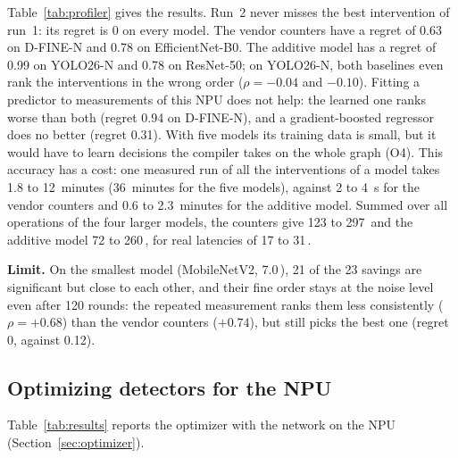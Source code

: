 \documentclass[conference]{IEEEtran}
\newcommand{\ms}{\,\text{ms}}
\begin{document}
Table~\ref{tab:profiler} gives the results. Run~2 never misses the best intervention of run~1: its regret is 0 on every model. The vendor counters have a regret of 0.63 on D-FINE-N and 0.78 on EfficientNet-B0. The additive model has a regret of 0.99 on YOLO26-N and 0.78 on ResNet-50; on YOLO26-N, both baselines even rank the interventions in the wrong order ($\rho = -0.04$ and $-0.10$). Fitting a predictor to measurements of this NPU does not help: the learned one ranks worse than both (regret 0.94 on D-FINE-N), and a gradient-boosted regressor does no better (regret 0.31). With five models its training data is small, but it would have to learn decisions the compiler takes on the whole graph (O4). This accuracy has a cost: one measured run of all the interventions of a model takes 1.8 to 12~minutes (36~minutes for the five models), against 2 to 4~s for the vendor counters and 0.6 to 2.3~minutes for the additive model. Summed over all operations of the four larger models, the counters give 123 to 297\ms{} and the additive model 72 to 260\ms{}, for real latencies of 17 to 31\ms{}.

\textbf{Limit.} On the smallest model (MobileNetV2, 7.0\ms{}), 21 of the 23 savings are significant but close to each other, and their fine order stays at the noise level even after 120 rounds: the repeated measurement ranks them less consistently ($\rho = +0.68$) than the vendor counters ($+0.74$), but still picks the best one (regret 0, against 0.12).

\subsection{Optimizing detectors for the NPU}
\label{sec:eval-optimizer}

Table~\ref{tab:results} reports the optimizer with the network on the NPU (Section~\ref{sec:optimizer}).
\end{document}
